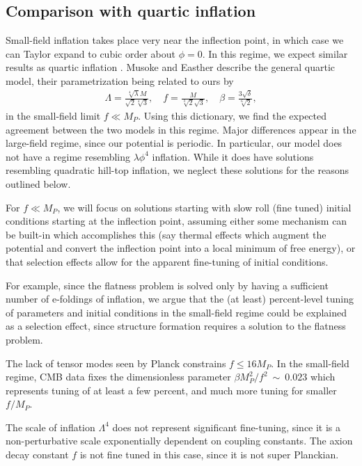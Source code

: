 \documentclass[aps,amsfonts,amsmath,prd,preprint,nofootinbib,superscriptaddress]{revtex4}
\newcommand{\Mp}{{M_{P}}}
\newcommand{\MMp}{{M_P^2}}
\begin{document}
\subsection{Comparison with quartic inflation}
Small-field inflation takes place very near the inflection point, in which case we can Taylor expand to cubic order about $\phi=0$. 
In this regime, we expect similar results as quartic inflation \cite{quartic}.  Musoke and Easther \cite{Musoke:2017frr} describe the general quartic model, their parametrization being related to ours by
\begin{align}
\Lambda = \frac{\sqrt[4]{\lambda } M}{\sqrt{2} \sqrt[4]{3}}, \quad f = \frac{M}{\sqrt[3]{2} \sqrt{3}}, \quad \beta = \frac{3 \sqrt{\delta}}{\sqrt[6]{2}},
\end{align}
in the small-field limit $f \ll \Mp$.  Using this dictionary, we find the expected agreement between the two models in this regime.
Major differences appear in the large-field regime, since our potential is periodic.  In particular, our model does not have a regime resembling $\lambda \phi^4$ inflation.  While it does
have solutions resembling quadratic hill-top inflation, we neglect these solutions for the reasons outlined below.

For $f \ll \Mp$, we will focus on solutions starting with slow roll (fine tuned) initial conditions starting at the inflection point, assuming either some mechanism can be built-in which accomplishes
this (say thermal effects which augment the potential and convert the inflection point into a local minimum of free energy), or that selection effects allow for the apparent fine-tuning of
initial conditions.

For example, since the flatness problem is solved only by having a sufficient number of e-foldings of inflation, we argue that the (at least) percent-level tuning of parameters and initial conditions in
the small-field regime could be explained as a selection effect, since structure formation requires a solution to the flatness problem.


The lack of tensor modes seen by Planck \cite{} constrains $f \leq 16\Mp$.  
In the small-field regime, CMB data fixes the dimensionless parameter $\beta \MMp/f^2~\sim~0.023$ which represents tuning of at least a few percent, and much more tuning for smaller $f/\Mp$.  

The scale of inflation $\Lambda^4$ does not represent significant fine-tuning, since it is a non-perturbative scale exponentially dependent on coupling constants.  
The axion decay constant $f$ is not fine tuned in this case, since it is not super Planckian.
\end{document}

